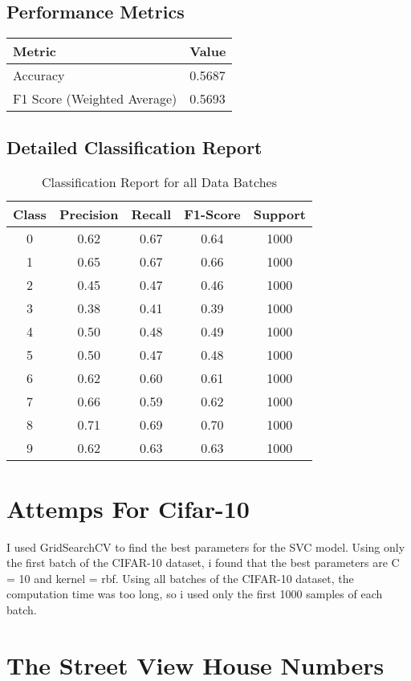 \documentclass{article}
\begin{document}
\subsection*{Performance Metrics}
\begin{tabular}{|l|l|}
\hline
\textbf{Metric} & \textbf{Value} \\ \hline
Accuracy & 0.5687 \\ \hline
F1 Score (Weighted Average) & 0.5693 \\ \hline
\end{tabular}

\subsection*{Detailed Classification Report}
\begin{table}[H]
\centering
\begin{tabular}{|c|c|c|c|c|}
\hline
\rowcolor[HTML]{ECF4FF} 
\textbf{Class} & \textbf{Precision} & \textbf{Recall} & \textbf{F1-Score} & \textbf{Support} \\ \hline
           0      & 0.62   &   0.67  &    0.64   &   1000 \\ \hline
           1     &  0.65 &     0.67&      0.66&      1000 \\ \hline
           2     &  0.45 &     0.47&      0.46&      1000 \\ \hline
           3     &  0.38 &     0.41&      0.39&      1000 \\ \hline
           4      & 0.50  &    0.48&      0.49&      1000 \\ \hline
           5      & 0.50  &    0.47&      0.48&      1000 \\ \hline
           6      & 0.62  &    0.60&      0.61&      1000 \\ \hline
           7      & 0.66  &    0.59&      0.62&      1000 \\ \hline
           8      & 0.71  &    0.69&      0.70&      1000 \\ \hline
           9      & 0.62  &    0.63&      0.63&      1000 \\ \hline
\end{tabular}
\caption*{Classification Report for all Data Batches}
\end{table}

\section{Attemps For Cifar-10}
I used GridSearchCV to find the best parameters for the SVC model.
Using only the first batch of the CIFAR-10 dataset, i found that the best parameters are C = 10 and kernel = rbf.
Using all batches of the CIFAR-10 dataset, the computation time was too long, so i used only the first 1000 samples of each batch.


\section{The Street View House Numbers}
\end{document}
